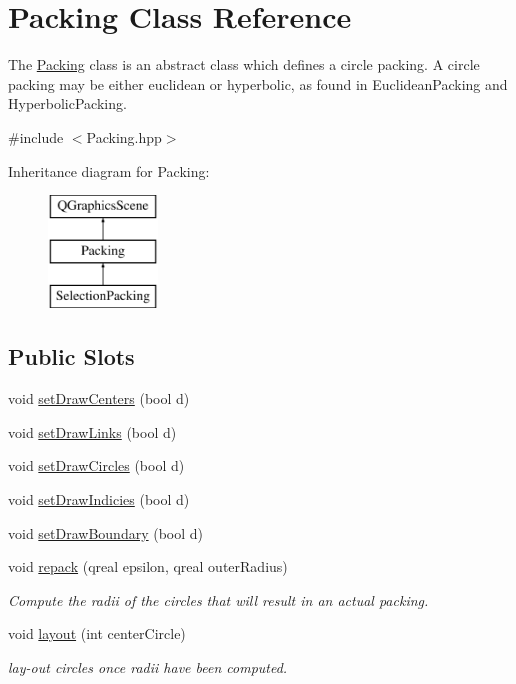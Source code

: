\hypertarget{class_packing}{}\section{Packing Class Reference}
\label{class_packing}


The \hyperlink{class_packing}{Packing} class is an abstract class which defines a circle packing. A circle packing may be either euclidean or hyperbolic, as found in Euclidean\+Packing and Hyperbolic\+Packing.  




{\ttfamily \#include $<$Packing.\+hpp$>$}

Inheritance diagram for Packing\+:\begin{figure}[H]
\begin{center}
\leavevmode
\includegraphics[height=3.000000cm]{class_packing}
\end{center}
\end{figure}
\subsection*{Public Slots}
\begin{DoxyCompactItemize}
\item 
void \hyperlink{class_packing_a3c5bdaac16b7f59c966bfa3e2572bfec}{set\+Draw\+Centers} (bool d)
\item 
void \hyperlink{class_packing_a8d95224738fdcfe7c27886c75a21a888}{set\+Draw\+Links} (bool d)
\item 
void \hyperlink{class_packing_adb39ee29cf54d899d2c7f3d924aca3e7}{set\+Draw\+Circles} (bool d)
\item 
void \hyperlink{class_packing_ae204c78072c0397bd55bb0d762258507}{set\+Draw\+Indicies} (bool d)
\item 
void \hyperlink{class_packing_a38f38eef21a2e8277a98c4d12f68f4e3}{set\+Draw\+Boundary} (bool d)
\item 
void \hyperlink{class_packing_a1a1ad296a875c5fe6463366296b389d4}{repack} (qreal epsilon, qreal outer\+Radius)
\begin{DoxyCompactList}\small\item\em Compute the radii of the circles that will result in an actual packing. \end{DoxyCompactList}\item 
void \hyperlink{class_packing_adc779649742314f9c9eaee0f43b1000a}{layout} (int center\+Circle)
\begin{DoxyCompactList}\small\item\em lay-\/out circles once radii have been computed. \end{DoxyCompactList}\end{DoxyCompactItemize}
